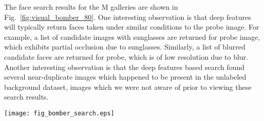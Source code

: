 \documentclass[10pt,journal,compsoc]{IEEEtran}
\begin{document}
The face search results for the M galleries are shown in Fig.~\ref{fig:visual_bomber_80}. One interesting observation is that deep features will typically return faces taken under similar conditions to the probe image. For example, a list of candidate images with sunglasses are returned for probe image, which exhibits partial occlusion due to sunglasses. Similarly, a list of blurred candidate faces are returned for probe, which is of low resolution due to blur. Another interesting observation is that the deep features based search found several near-duplicate images which happened to be present in the unlabeled background dataset, images which we were not aware of prior to viewing these search results.

\newcommand{\includeBomberVisual}[1]{\texttt{[image: \#1]}}
\begin{figure*}[htbp]
    \centering
    \texttt{[image: fig\_bomber\_search.eps]}\vspace{-0.1in}
    \caption{Top  search results for the two Boston marathon bombers on the M face gallery. The first two probe faces  are of the older brother (Dzhokhar Tsarnaev) and the last three probe faces are of the younger brother (Tamerlan Tsarnaev). For each probe face, the retrieved image with \textcolor{green}{green} border is the correctly retrieved image. Images with the \textcolor{red}{red} border are near-duplicate images present in the gallery. Note that we were not aware of the existence of these near-duplicate images in the gallery before the search.} \label{fig:visual_bomber_80}
\end{figure*}
\end{document}

